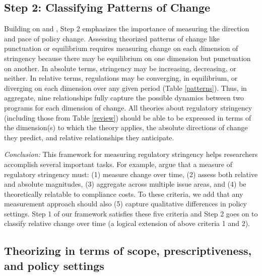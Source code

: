 \documentclass[
      12pt,
            Review ]{article}
\begin{document}
\hypertarget{step-2-classifying-patterns-of-change}{%
\subsection{Step 2: Classifying Patterns of Change}\label{step-2-classifying-patterns-of-change}}

Building on \citet{Baumgartner2002} and \citet{Howlett2007}, Step 2 emphasizes the importance of measuring the direction and pace of policy change. Assessing theorized patterns of change like punctuation or equilibrium requires measuring change on each dimension of stringency because there may be equilibrium on one dimension but punctuation on another. In absolute terms, stringency may be increasing, decreasing, or neither. In relative terms, regulations may be converging, in equilibrium, or diverging on each dimension over any given period (Table \ref{patterns}). Thus, in aggregate, nine relationships fully capture the possible dynamics between two programs for each dimension of change. All theories about regulatory stringency (including those from Table \ref{review}) should be able to be expressed in terms of the dimension(s) to which the theory applies, the absolute directions of change they predict, and relative relationships they anticipate.



\emph{Conclusion:} This framework for measuring regulatory stringency helps researchers accomplish several important tasks. For example, \citet{Brunel2016} argue that a measure of regulatory stringency must: (1) measure change over time, (2) assess both relative and absolute magnitudes, (3) aggregate across multiple issue areas, and (4) be theoretically relatable to compliance costs. To these criteria, we add that any measurement approach should also (5) capture qualitative differences in policy settings. Step 1 of our framework satisfies these five criteria and Step 2 goes on to classify relative change over time (a logical extension of above criteria 1 and 2).

\hypertarget{theorizing-in-terms-of-scope-prescriptiveness-and-policy-settings}{%
\subsection{Theorizing in terms of scope, prescriptiveness, and policy settings}\label{theorizing-in-terms-of-scope-prescriptiveness-and-policy-settings}}
\end{document}
